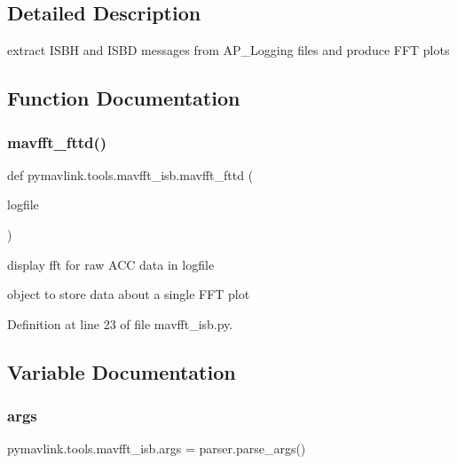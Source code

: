 \subsection{Detailed Description}
\begin{DoxyVerb}extract ISBH and ISBD messages from AP_Logging files and produce FFT plots
\end{DoxyVerb}
 

\subsection{Function Documentation}
\mbox{\label{namespacepymavlink_1_1tools_1_1mavfft__isb_afccb65d686e62d19b1fe4564c29052f5}} 
\subsubsection{\texorpdfstring{mavfft\_fttd()}{mavfft\_fttd()}}
{\footnotesize\ttfamily def pymavlink.\+tools.\+mavfft\+\_\+isb.\+mavfft\+\_\+fttd (\begin{DoxyParamCaption}\item[{}]{logfile }\end{DoxyParamCaption})}

\begin{DoxyVerb}display fft for raw ACC data in logfile\end{DoxyVerb}
\begin{DoxyVerb}object to store data about a single FFT plot\end{DoxyVerb}
 

Definition at line 23 of file mavfft\+\_\+isb.\+py.



\subsection{Variable Documentation}
\mbox{\label{namespacepymavlink_1_1tools_1_1mavfft__isb_ad748dda4c0238e001008473041b7f443}} 
\subsubsection{\texorpdfstring{args}{args}}
{\footnotesize\ttfamily pymavlink.\+tools.\+mavfft\+\_\+isb.\+args = parser.\+parse\+\_\+args()}



